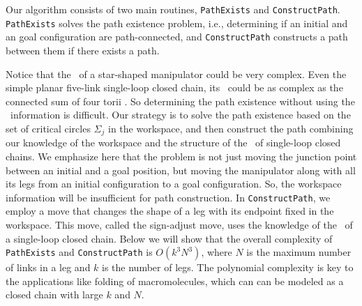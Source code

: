 \label{section-3} Our algorithm consists of two main routines,
{\tt PathExists} and {\tt ConstructPath}. {\tt PathExists} solves
the path existence problem, i.e., determining if an initial and an
goal configuration are path-connected, and {\tt ConstructPath}
constructs a path between them if there exists a path.

Notice that the \cspace \ of a star-shaped manipulator could be
very complex. Even the simple planar five-link single-loop closed
chain, its \cspace \ could be as complex as the connected sum of
four torii \cite{MT1}. So determining the path existence without
using the \cspace \ information is difficult. Our strategy is to
solve the path existence based on the set of critical circles
$\Sigma_j$ in the workspace, and then construct the path combining
our knowledge of the workspace and the structure of the \cspace \
of single-loop closed chains. We emphasize here that the problem
is not just moving the junction point between an initial and a
goal position, but moving the manipulator along with all its legs
from an initial configuration to a goal configuration. So, the
workspace information will be insufficient for path construction.
In {\tt ConstructPath}, we employ a move that changes the shape of
a leg with its endpoint fixed in the workspace. This move, called
the sign-adjust move, uses the knowledge of the \cspace \ of a
single-loop closed chain. Below we will show that the overall
complexity of {\tt PathExists} and {\tt ConstructPath} is
$O(k^3N^3)$, where $N$ is the maximum number of links in a leg and
$k$ is the number of legs. The polynomial complexity is key to the
applications like folding of macromolecules, which can can be
modeled as a closed chain with large $k$ and $N$.


